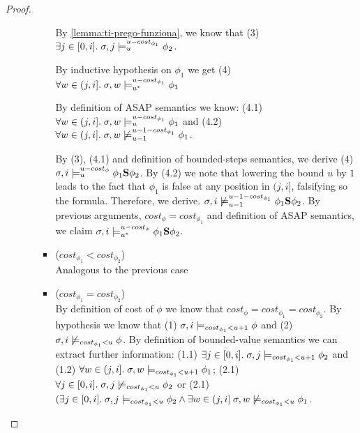 \begin{theorem}
\begin{proof}
\begin{itemize}
\begin{itemize}
\begin{itemize}
            By \autoref{lemma:ti-prego-funziona}, we know that (3) $\exists j \in [0,i].\; \sigma,j \models_{u}^{u-cost_{\phi_1}} \phi_2$.

            By inductive hypothesis on $\phi_1$ we get (4) $\forall w \in (j,i].\; \sigma,w \models_{{u}^*}^{u-cost_{\phi_1}} \phi_1$

            By definition of ASAP semantics we know: (4.1) $\forall w \in (j,i].\; \sigma,w \models_{u}^{u-cost_{\phi_1}} \phi_1$ and (4.2) $\forall w \in (j,i].\; \sigma,w \not\models_{u-1}^{u-1-cost_{\phi_1}} \phi_1$.

            By (3), (4.1) and definition of bounded-steps semantics, we derive (4)$\sigma,i \models_{u}^{u-cost_\phi} \phi_1 \mathbf{S} \phi_2$.
            By (4.2) we note that lowering the bound $u$ by $1$ leads to the fact that $\phi_1$ is false at any position in $(j,i]$, falsifying so the formula.
            Therefore, we derive. $\sigma,i \not\models_{u-1}^{u-1-cost_{\phi_1}} \phi_1 \mathbf{S} \phi_2$.
            By previous arguments, $cost_\phi = cost_{\phi_1}$ and definition of ASAP semantics, we claim $\sigma,i \models_{{u}^*}^{u-cost_\phi} \phi_1 \mathbf{S} \phi_2$.

            \item ($cost_{\phi_1} < cost_{\phi_2}$) \\
            Analogous to the previous case

            \item ($cost_{\phi_1} = cost_{\phi_2}$) \\
            By definition of cost of $\phi$ we know that $cost_\phi = cost_{\phi_1} = cost_{\phi_2}$.
            By hypothesis we know that 
            (1) $\sigma, i \models_{cost_{\phi_1} < u + 1} \phi$ and 
            (2) $\sigma, i \not\models_{cost_{\phi_1} < u} \phi$.
            By definition of bounded-value semantics we can extract further information:
            (1.1) $\exists j \in [0,i].\; \sigma,j \models_{cost_{\phi_1} < u + 1} \phi_2$ and 
            (1.2) $\forall w \in (j,i].\; \sigma,w \models_{cost_{\phi_1} < u + 1} \phi_1$;
            (2.1) $\forall j \in [0,i].\; \sigma,j \not\models_{cost_{\phi_1} < u} \phi_2$ or
            (2.1) $(\exists j \in [0,i].\; \sigma,j \models_{cost_{\phi_1} < u} \phi_2 \land \exists w \in (j,i]\; \sigma,w \not\models_{cost_{\phi_1} < u} \phi_1$.


\end{itemize}
\end{itemize}
\end{itemize}
\end{proof}
\end{theorem}

